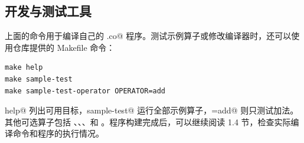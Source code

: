\subsection*{开发与测试工具}

上面的命令用于编译自己的 \co@.co@ 程序。测试示例算子或修改编译器时，还可以使用仓库提供的 Makefile 命令：

\begin{lstlisting}[language=croqtile,caption={测试示例算子}]
make help
make sample-test
make sample-test-operator OPERATOR=add
\end{lstlisting}

\co@make help@ 列出可用目标，\co@make sample-test@ 运行全部示例算子，\co@OPERATOR=add@ 则只测试加法。其他可选算子包括 \co@mul@、\co@relu@、\co@sigmoid@、\co@softmax@ 和 \co@tanh@。程序构建完成后，可以继续阅读 1.4 节，检查实际编译命令和程序的执行情况。
